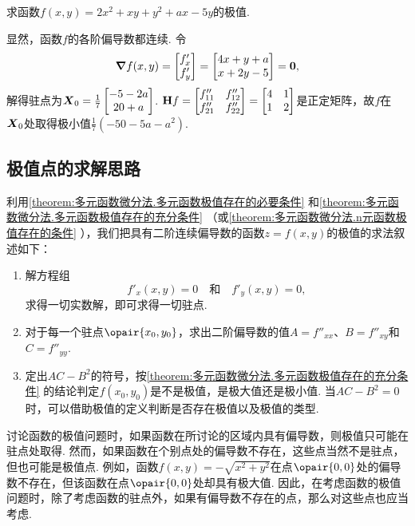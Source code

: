 \begin{example}
求函数\(f(x,y) = 2x^2 + xy + y^2 + ax - 5y\)的极值.
\begin{solution}
显然，函数\(f\)的各阶偏导数都连续.
令\[
\grad f(x,y) = \begin{bmatrix} f'_x \\ f'_y \end{bmatrix}
= \begin{bmatrix} 4x+y+a \\ x+2y-5 \end{bmatrix} = \boldsymbol{0},
\]解得驻点为\(\boldsymbol{X}_{0} = \frac{1}{7} \begin{bmatrix} -5-2a \\ 20+a \end{bmatrix}\).
\(\boldsymbol{\operatorname{H}} f = \begin{bmatrix}
f''_{11} & f''_{12} \\
f''_{21} & f''_{22}
\end{bmatrix} = \begin{bmatrix}
4 & 1 \\
1 & 2
\end{bmatrix}\)是正定矩阵，故\(f\)在\(\boldsymbol{X}_{0}\)处取得极小值\(\frac{1}{7} (-50-5a-a^2)\).
\end{solution}
\end{example}

\subsection{极值点的求解思路}
利用\cref{theorem:多元函数微分法.多元函数极值存在的必要条件} 和\cref{theorem:多元函数微分法.多元函数极值存在的充分条件} （或\cref{theorem:多元函数微分法.n元函数极值存在的条件} ），我们把具有二阶连续偏导数的函数\(z = f(x,y)\)的极值的求法叙述如下：
\begin{enumerate}
\item 解方程组\[
f'_x(x,y) = 0
\quad\text{和}\quad
f'_y(x,y) = 0,
\]求得一切实数解，即可求得一切驻点.

\item 对于每一个驻点\(\opair{x_0,y_0}\)，求出二阶偏导数的值\(A=f''_{xx}\)、\(B=f''_{xy}\)和\(C=f''_{yy}\).

\item 定出\(AC-B^2\)的符号，按\cref{theorem:多元函数微分法.多元函数极值存在的充分条件} 的结论判定\(f(x_0,y_0)\)是不是极值，是极大值还是极小值.
当\(AC-B^2=0\)时，可以借助极值的定义判断是否存在极值以及极值的类型.
\end{enumerate}

讨论函数的极值问题时，如果函数在所讨论的区域内具有偏导数，则极值只可能在驻点处取得.
然而，如果函数在个别点处的偏导数不存在，这些点当然不是驻点，但也可能是极值点.
例如，函数\(f(x,y) = -\sqrt{x^2+y^2}\)在点\(\opair{0,0}\)处的偏导数不存在，但该函数在点\(\opair{0,0}\)处却具有极大值.
因此，在考虑函数的极值问题时，除了考虑函数的驻点外，如果有偏导数不存在的点，那么对这些点也应当考虑.

